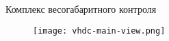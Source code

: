 \begin{frame}{Комплекс весогабаритного контроля}
\begin{figure}
    \centering
    \texttt{[image: vhdc-main-view.png]}
\end{figure}
\end{frame}
